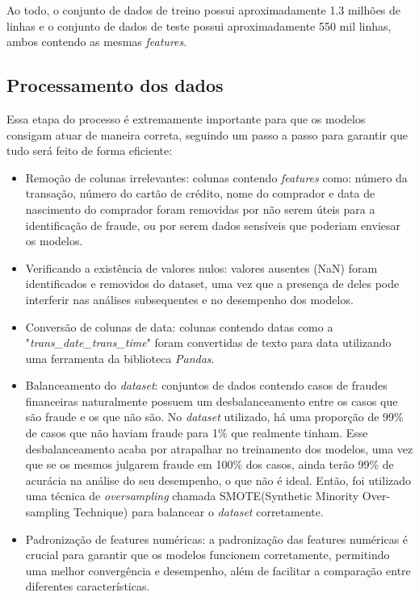 \documentclass[conference]{IEEEtran}
\begin{document}
Ao todo, o conjunto de dados de treino possui aproximadamente 1.3 milhões de linhas e o conjunto de dados de teste possui aproximadamente 550 mil linhas, ambos contendo as mesmas \textit{features}.

\subsection{Processamento dos dados}

Essa etapa do processo é extremamente importante para que os modelos consigam atuar de maneira correta, seguindo um passo a passo para garantir que tudo será feito de forma eficiente:

\begin{itemize}
    \item Remoção de colunas irrelevantes: colunas contendo \textit{features} como: número da transação, número do cartão de crédito, nome do comprador e data de nascimento do comprador foram removidas por não serem úteis para a identificação de fraude, ou por serem dados sensíveis que poderiam enviesar os modelos.

    \item Verificando a existência de valores nulos: valores ausentes (NaN) foram identificados e removidos do dataset, uma vez que a presença de deles pode interferir nas análises subsequentes e no desempenho dos modelos.

    \item Conversão de colunas de data: colunas contendo datas como a "\textit{trans\_date\_trans\_time}" foram convertidas de texto para data utilizando uma ferramenta da biblioteca \textit{Pandas}.

    \item Balanceamento do \textit{dataset}: conjuntos de dados contendo casos de fraudes financeiras naturalmente possuem um desbalanceamento entre os casos que são fraude e os que não são. No \textit{dataset} utilizado, há uma proporção de 99\% de casos que não haviam fraude para 1\% que realmente tinham. Esse desbalanceamento acaba por atrapalhar no treinamento dos modelos, uma vez que se os mesmos julgarem fraude em 100\% dos casos, ainda terão 99\% de acurácia na análise do seu desempenho, o que não é ideal. Então, foi utilizado uma técnica de \textit{oversampling} chamada SMOTE(Synthetic Minority Over-sampling Technique) para balancear o \textit{dataset} corretamente.

    \item Padronização de features numéricas: a padronização das features numéricas é crucial para garantir que os modelos funcionem corretamente, permitindo uma melhor convergência e desempenho, além de facilitar a comparação entre diferentes características.
\end{itemize}
\end{document}
